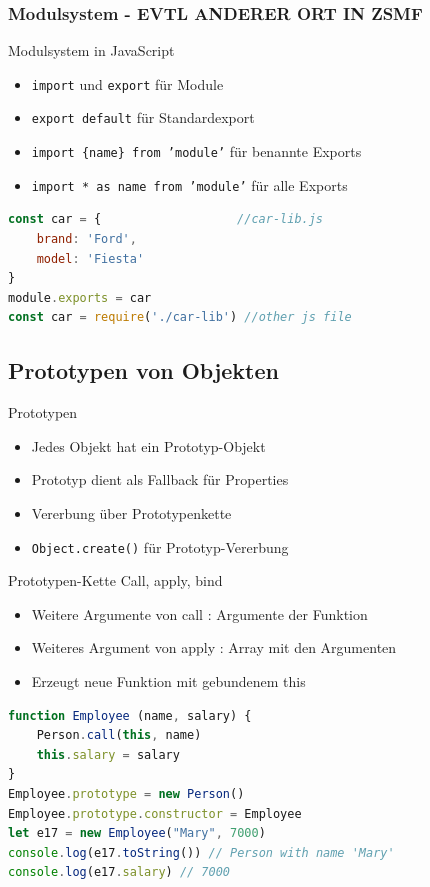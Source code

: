 \subsubsection{Modulsystem - EVTL ANDERER ORT IN ZSMF}

\begin{concept}{Modulsystem in JavaScript}
    \begin{itemize}
        \item \texttt{import} und \texttt{export} für Module
        \item \texttt{export default} für Standardexport
        \item \texttt{import \{name\} from 'module'} für benannte Exports
        \item \texttt{import * as name from 'module'} für alle Exports
    \end{itemize}
\begin{lstlisting}[language=JavaScript, style=basesmol]
const car = {                   //car-lib.js
    brand: 'Ford',
    model: 'Fiesta'
}
module.exports = car
const car = require('./car-lib') //other js file
\end{lstlisting}
\end{concept}

\subsection{Prototypen von Objekten}

\begin{concept}{Prototypen}
    \begin{itemize}
        \item Jedes Objekt hat ein Prototyp-Objekt
        \item Prototyp dient als Fallback für Properties
        \item Vererbung über Prototypenkette
        \item \texttt{Object.create()} für Prototyp-Vererbung
    \end{itemize}
\end{concept}

\begin{concept}{Prototypen-Kette}
    Call, apply, bind
    \begin{itemize}
        \item Weitere Argumente von call : Argumente der Funktion
        \item Weiteres Argument von apply : Array mit den Argumenten
        \item Erzeugt neue Funktion mit gebundenem this
    \end{itemize}
\begin{lstlisting}[language=JavaScript, style=basesmol]
function Employee (name, salary) {
    Person.call(this, name)
    this.salary = salary
}
Employee.prototype = new Person()
Employee.prototype.constructor = Employee
let e17 = new Employee("Mary", 7000)
console.log(e17.toString()) // Person with name 'Mary' 
console.log(e17.salary) // 7000 
\end{lstlisting}
\end{concept}

